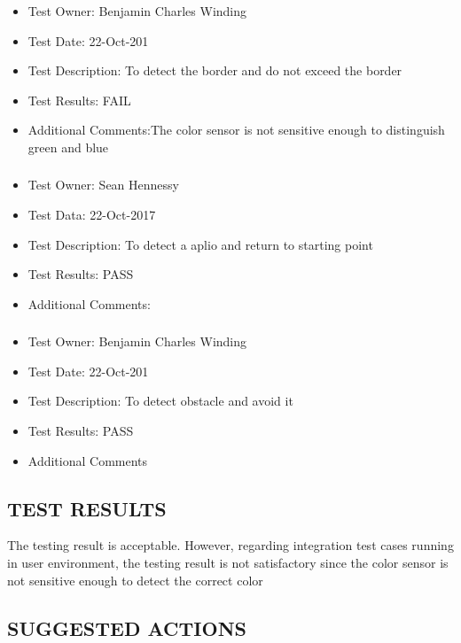 \documentclass[10pt,a4paper,titlepage]{article}
\begin{document}
\subsubsection{}
\begin{itemize}
	\item Test Owner: Benjamin Charles Winding
	\item Test Date: 22-Oct-201
	\item Test Description: To detect the border and do not exceed the border
	\item Test Results: FAIL
	\item Additional Comments:The color sensor is not sensitive enough to distinguish green and blue
\end{itemize}		

\subsubsection{}
\begin{itemize}
	\item Test Owner: Sean Hennessy
	\item Test Data: 22-Oct-2017
	\item Test Description: To detect a aplio and return to starting point
	\item Test Results: PASS 
	\item Additional Comments: 
	
\end{itemize}

\subsubsection{}
\begin{itemize}
	\item Test Owner: Benjamin Charles Winding
	\item Test Date: 22-Oct-201
	\item Test Description: To detect obstacle and avoid it 
	\item Test Results: PASS
	\item Additional Comments	
\end{itemize}
	
\subsection{TEST RESULTS}
The testing result is acceptable. However, regarding integration test cases running in user environment, the testing result is not satisfactory since the color sensor is not sensitive enough to detect the correct color

\subsection{SUGGESTED ACTIONS}
\end{document}
